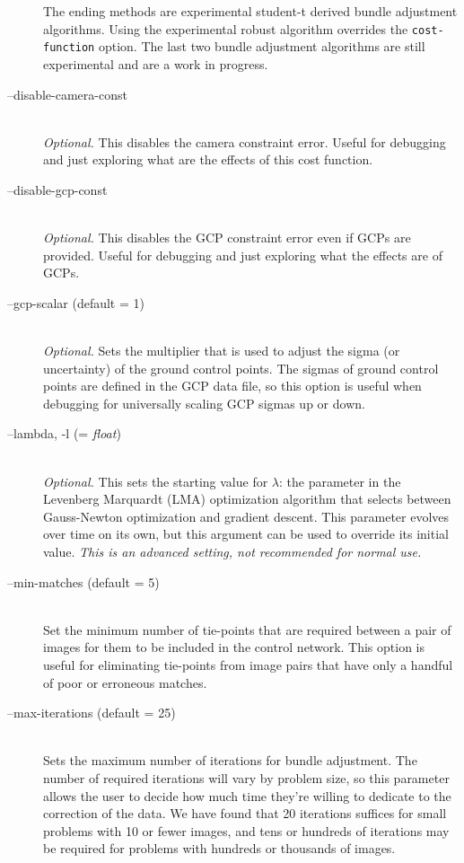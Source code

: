 \begin{description}
  The ending methods are experimental student-t derived bundle
  adjustment algorithms. Using the experimental robust algorithm
  overrides the {\tt cost-function} option. The last two bundle
  adjustment algorithms are still experimental and are a work in
  progress.

\item[--disable-camera-const] \hfill \\
  \emph{Optional.} This disables the camera constraint error. Useful
  for debugging and just exploring what are the effects of this cost
  function.

\item[--disable-gcp-const] \hfill \\
  \emph{Optional.} This disables the GCP constraint error even if GCPs
  are provided. Useful for debugging and just exploring what the
  effects are of GCPs.

\item[--gcp-scalar \textnormal{\small{(default = 1)}}] \hfill \\
  \emph{Optional.} Sets the multiplier that is used to adjust the
  sigma (or uncertainty) of the ground control points. The sigmas of
  ground control points are defined in the GCP data file, so this
  option is useful when debugging for universally scaling GCP sigmas
  up or down.

\item[--lambda, -l \textnormal{\small{(= \emph{float})}}] \hfill \\
  \emph{Optional.} This sets the starting value for $\lambda$: the
  parameter in the Levenberg Marquardt (LMA) optimization algorithm
  that selects between Gauss-Newton optimization and gradient
  descent. This parameter evolves over time on its own, but this
  argument can be used to override its initial value. \emph{This is an
  advanced setting, not recommended for normal use.}

\item[--min-matches \textnormal{\small{(default = 5)}}] \hfill \\
  Set the minimum number of tie-points that are required between a
  pair of images for them to be included in the control network. This
  option is useful for eliminating tie-points from image pairs that
  have only a handful of poor or erroneous matches.

\item[--max-iterations \textnormal{\small{(default = 25)}}] \hfill \\
  Sets the maximum number of iterations for bundle adjustment. The
  number of required iterations will vary by problem size, so this
  parameter allows the user to decide how much time they're willing
  to dedicate to the correction of the data.  We have found that 20
  iterations suffices for small problems with 10 or fewer images, and
  tens or hundreds of iterations may be required for problems with
  hundreds or thousands of images.


\end{description}
